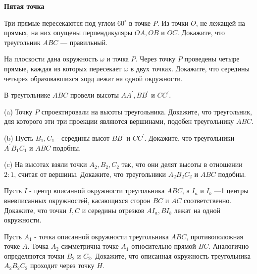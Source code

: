 \centerline{\bf \Huge Пятая точка}

\begin{flushright}
        \scriptsize{}
\end{flushright}

Три прямые пересекаются под углом $60^{\circ}$ в точке $P$. Из точки $O$, не лежащей на прямых, на них опущены перпендикуляры $O A, O B$ и $O C$. Докажите, что треугольник $A B C$ --- правильный.

На плоскости дана окружность $\omega$ и точка $P$. Через точку $P$ проведены четыре прямые, каждая из которых пересекает $\omega$ в двух точках. Докажите, что середины четырех образовавшихся хорд лежат на одной окружности.

В треугольнике $A B C$ провели высоты $A A^{\prime}, B B^{\prime}$ и $C C^{\prime}$.

(a) Точку $P$ спроектировали на высоты треугольника. Докажите, что треугольник, для которого эти три проекции являются вершинами, подобен треугольнику $A B C$.

(b) Пусть $B_1, C_1$ - середины высот $B B^{\prime}$ и $C C^{\prime}$. Докажите, что треугольники $A^{\prime} B_1 C_1$ и $A B C$ подобны.

(c) На высотах взяли точки $A_2, B_2, C_2$ так, что они делят высоты в отношении $2: 1$, считая от вершины. Докажите, что треугольники $A_2 B_2 C_2$ и $A B C$ подобны.

Пусть $I$ - центр вписанной окружности треугольника $A B C$, а $I_a$ и $I_b$ ---1 центры вневписанных окружностей, касающихся сторон $B C$ и $A C$ соответственно. Докажите, что точки $I, C$ и середины отрезков $A I_a, B I_b$ лежат на одной окружности.

Пусть $A_1$ - точка описанной окружности треугольника $A B C$, противоположная точке $A$. Точка $A_2$ симметрична точке $A_1$ относительно прямой $B C$. Аналогично определяются точки $B_2$ и $C_2$. Докажите, что описанная окружность треугольника $A_2 B_2 C_2$ проходит через точку $H$.